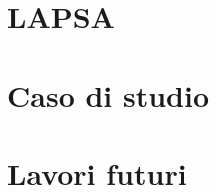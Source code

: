 \documentclass[handout]{beamer}
\begin{document}
	\section{LAPSA}
	\section{Caso di studio}
	\section{Lavori futuri}
	
\end{document}
